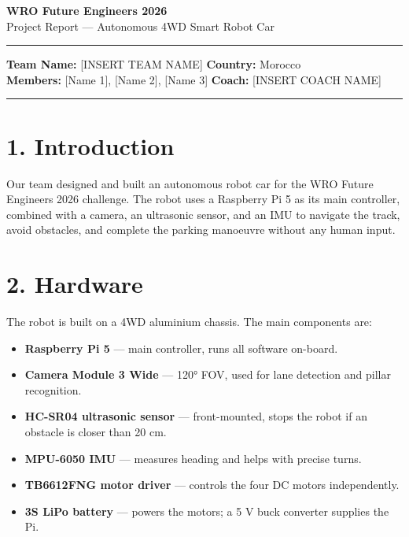 \documentclass[11pt,a4paper]{article}
\begin{document}
\begin{center}
  {\LARGE\bfseries WRO Future Engineers 2026}\\[0.4em]
  {\large Project Report --- Autonomous 4WD Smart Robot Car}\\[0.3em]
  \rule{\linewidth}{1pt}
\end{center}

\medskip
\noindent
\textbf{Team Name:} [INSERT TEAM NAME] \hfill \textbf{Country:} Morocco \\
\textbf{Members:} [Name 1], [Name 2], [Name 3] \hfill \textbf{Coach:} [INSERT COACH NAME]

\rule{\linewidth}{0.4pt}

\section*{1. Introduction}

Our team designed and built an autonomous robot car for the WRO Future Engineers 2026
challenge. The robot uses a Raspberry Pi 5 as its main controller, combined with a
camera, an ultrasonic sensor, and an IMU to navigate the track, avoid obstacles, and
complete the parking manoeuvre without any human input.

\section*{2. Hardware}

The robot is built on a 4WD aluminium chassis. The main components are:

\begin{itemize}[leftmargin=1.5em, itemsep=2pt]
  \item \textbf{Raspberry Pi 5} --- main controller, runs all software on-board.
  \item \textbf{Camera Module 3 Wide} --- 120° FOV, used for lane detection and pillar recognition.
  \item \textbf{HC-SR04 ultrasonic sensor} --- front-mounted, stops the robot if an obstacle is closer than 20 cm.
  \item \textbf{MPU-6050 IMU} --- measures heading and helps with precise turns.
  \item \textbf{TB6612FNG motor driver} --- controls the four DC motors independently.
  \item \textbf{3S LiPo battery} --- powers the motors; a 5 V buck converter supplies the Pi.
\end{itemize}
\end{document}
